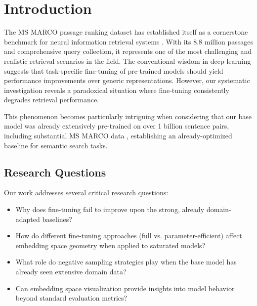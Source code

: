 
\chapter{Introduction} %

\label{Chapter1} %


\newcommand{\keyword}[1]{\textbf{#1}}
\newcommand{\tabhead}[1]{\textbf{#1}}
\newcommand{\code}[1]{\texttt{#1}}
\newcommand{\file}[1]{\texttt{\bfseries#1}}
\newcommand{\option}[1]{\texttt{\itshape#1}}


The MS MARCO passage ranking dataset has established itself as a cornerstone benchmark for neural information retrieval systems \cite{msmarco}. With its 8.8 million passages and comprehensive query collection, it represents one of the most challenging and realistic retrieval scenarios in the field. The conventional wisdom in deep learning suggests that task-specific fine-tuning of pre-trained models should yield performance improvements over generic representations. However, our systematic investigation reveals a paradoxical situation where fine-tuning consistently degrades retrieval performance.

This phenomenon becomes particularly intriguing when considering that our base model was already extensively pre-trained on over 1 billion sentence pairs, including substantial MS MARCO data \cite{huggingface_minilm}, establishing an already-optimized baseline for semantic search tasks.

\section{Research Questions}

Our work addresses several critical research questions:

\begin{itemize}
\item Why does fine-tuning fail to improve upon the strong, already domain-adapted baselines?
\item How do different fine-tuning approaches (full vs. parameter-efficient) affect embedding space geometry when applied to saturated models?
\item What role do negative sampling strategies play when the base model has already seen extensive domain data?
\item Can embedding space visualization provide insights into model behavior beyond standard evaluation metrics?
\end{itemize}

